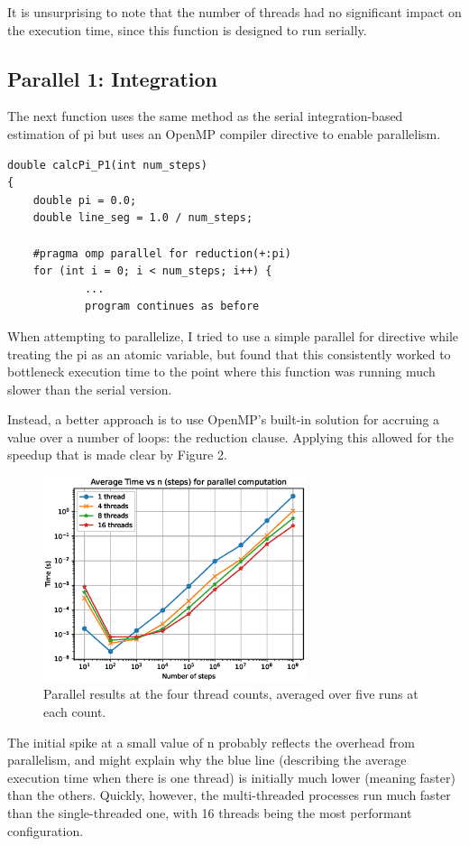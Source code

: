 \documentclass[a4paper]{article}
\begin{document}
It is unsurprising to note that the number of threads had no significant impact on the execution time, since this function is designed to run serially.  

\subsection{Parallel 1: Integration}
The next function uses the same method as the serial integration-based estimation of pi but uses an OpenMP compiler directive to enable parallelism. 

\begin{verbatim}
double calcPi_P1(int num_steps)
{
    double pi = 0.0;
    double line_seg = 1.0 / num_steps;
    
    #pragma omp parallel for reduction(+:pi)
    for (int i = 0; i < num_steps; i++) {
            ... 
            program continues as before 
\end{verbatim}

When attempting to parallelize, I tried to use a simple parallel for directive while treating the pi as an atomic variable, but found that this consistently worked to bottleneck execution time to the point where this function was running much slower than the serial version. 

Instead, a better approach is to use OpenMP's built-in solution for accruing a value over a number of loops: the reduction clause. Applying this allowed for the speedup that is made clear by Figure 2. 

\begin{figure}[ht]
\begin{center}
\includegraphics[height=6cm]{paral1.eps}
\caption{Parallel results at the four thread counts, averaged over five runs at each count.}
\label{fig2}
\end{center}
\end{figure}

The initial spike at a small value of n probably reflects the overhead from parallelism, and might explain why the blue line (describing the average execution time when there is one thread) is initially much lower (meaning faster) than the others. Quickly, however, the multi-threaded processes run much faster than the single-threaded one, with 16 threads being the most performant configuration. 
\end{document}
